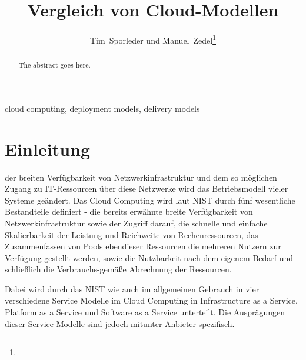 \documentclass[journal]{IEEEtran}
\begin{document}
\title{Vergleich von Cloud-Modellen}

\author{Tim~Sporleder und Manuel~Zedel\thanks{}}


\maketitle

\begin{abstract}
The abstract goes here.
\end{abstract}

\begin{IEEEkeywords}
cloud computing, deployment models, delivery models
\end{IEEEkeywords}

\section{Einleitung}
% 
% 
% 
% 
 der breiten Verfügbarkeit von Netzwerkinfrastruktur und dem so möglichen Zugang zu IT-Ressourcen über diese Netzwerke wird das Betriebsmodell vieler Systeme geändert. Das Cloud Computing wird laut NIST durch fünf wesentliche Bestandteile definiert - die bereits erwähnte breite Verfügbarkeit von Netzwerkinfrastruktur sowie der Zugriff darauf, die schnelle und einfache Skalierbarkeit der Leistung und Reichweite von Rechenressourcen, das Zusammenfassen von Pools ebendieser Ressourcen die mehreren Nutzern zur Verfügung gestellt werden, sowie die Nutzbarkeit nach dem eigenem Bedarf und schließlich die Verbrauchs-gemäße Abrechnung der Ressourcen.

Dabei wird durch das NIST wie auch im allgemeinen Gebrauch in vier verschiedene Service Modelle im Cloud Computing in Infrastructure as a Service, Platform as a Service und Software as a Service unterteilt. Die Ausprägungen dieser Service Modelle sind jedoch mitunter Anbieter-spezifisch.
\end{document}
